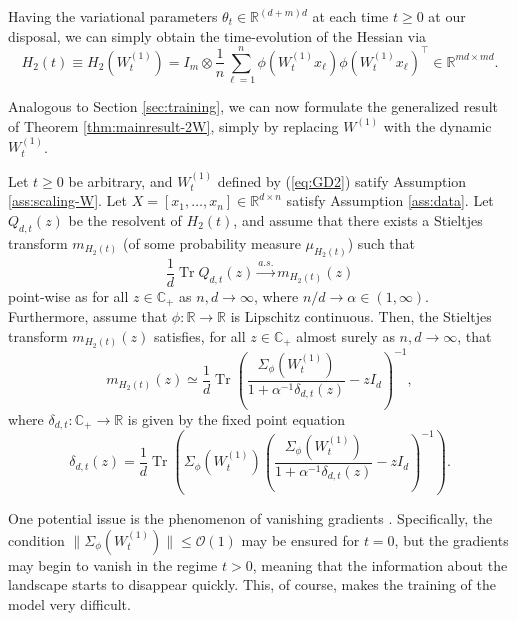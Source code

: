 \documentclass{article}
\begin{document}
Having the variational parameters $\theta_t\in\mathbb{R}^{(d+m)d}$ at each time $t\geq0$ at our disposal, we can simply obtain the time-evolution of the Hessian via
\begin{equation}
H_2(t)\equiv H_2(W^{(1)}_t)=I_m\otimes\frac{1}{n}\sum_{\ell=1}^n\phi(W^{(1)}_tx_\ell)\phi(W^{(1)}_tx_\ell)^\top\in\mathbb{R}^{md\times md}.
\end{equation}
\par
Analogous to Section \ref{sec:training}, we can now formulate the generalized result of Theorem \ref{thm:mainresult-2W}, simply by replacing $W^{(1)}$ with the dynamic $W^{(1)}_t$.
\bigskip
\begin{theorem}
Let $t\geq0$ be arbitrary, and $W^{(1)}_t$ defined by (\ref{eq:GD2}) satify Assumption \ref{ass:scaling-W}. Let $X=[x_1,\dots,x_n]\in\mathbb{R}^{d\times n}$ satisfy Assumption \ref{ass:data}. Let $Q_{d,t}(z)$ be the resolvent of $H_2(t)$, and assume that there exists a Stieltjes transform $m_{H_2(t)}$ (of some probability measure $\mu_{H_2(t)}$) such that
$$\frac{1}{d}\operatorname{Tr}Q_{d,t}(z)\stackrel{a.s.}{\to}m_{H_2(t)}(z)$$ 
point-wise as for all $z\in\mathbb{C}_+$ as $n,d\to\infty$, where $n/d\to\alpha\in(1,\infty)$. Furthermore, assume that $\phi:\mathbb{R}\to\mathbb{R}$ is Lipschitz continuous. Then, the Stieltjes transform $m_{H_2(t)}(z)$ satisfies, for all $z\in\mathbb{C}_+$ almost surely as $n,d\to\infty$, that
\begin{equation*}
m_{H_2(t)}(z)\simeq\frac{1}{d}\operatorname{Tr}\left(\frac{\Sigma_\phi(W^{(1)}_t)}{1+\alpha^{-1}\delta_{d,t}(z)}-zI_d\right)^{-1},
\end{equation*}
where $\delta_{d,t}:\mathbb{C}_+\to\mathbb{R}$ is given by the fixed point equation
\begin{equation*}
\delta_{d,t}(z)=\frac{1}{d}\operatorname{Tr}\left(\Sigma_\phi(W^{(1)}_t)\left(\frac{\Sigma_\phi(W^{(1)}_t)}{1+\alpha^{-1}\delta_{d,t}(z)}-zI_d\right)^{-1}\right).
\end{equation*}
\end{theorem}
\bigskip
\noindent
\par
One potential issue is the phenomenon of vanishing gradients \cite{orvieto}. Specifically, the condition $\|\Sigma_\phi(W^{(1)}_t)\|\leq\mathcal{O}(1)$ may be ensured for $t=0$, but the gradients may begin to vanish in the regime $t>0$, meaning that the information about the landscape starts to disappear quickly. This, of course, makes the training of the model very difficult.
\end{document}
